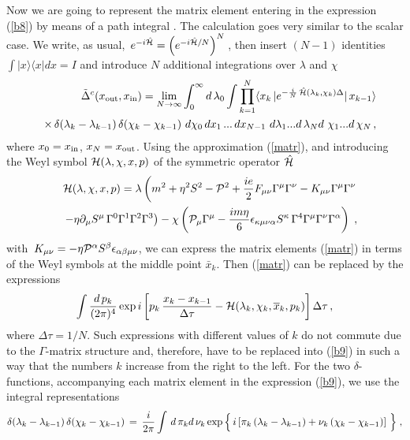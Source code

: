 Now we are going to represent the matrix element entering 
in the expression (\ref{b8}) by means of a path integral
\cite{FraGi91,gegi}. The calculation goes very
similar to the scalar case. We  write, as
usual, $\,e^{-i\hat{{\cal H}}} = \left(e^{-i\hat{{\cal H}}/N}
\right)^N\,$, then insert $(N-1)$
identities $\int|x\rangle\langle x|dx = I$ and
introduce $N$ additional integrations over $\lambda$ and $\chi$
\begin{eqnarray}
\label{b9}
&& \tilde{\Delta}^c(x_{\rm out},x_{\rm in}) =  \lim_{N\rightarrow
\infty} \int_0^\infty d\, \lambda_0
\int \prod_{k=1}^{N}\langle x_k\,|
e^{-\frac{i}{N}\,\hat{{\cal H}}(\lambda_k,\chi_k)\Delta}|\,x_{k-1}
\rangle \\
&&
\times\,\delta(\lambda_k-\lambda_{k-1})\,\delta(\chi_k-\chi_{k-1})
\,\,d\chi_0\, dx_1\, ...\, d x_{N-1}
\,\,d\lambda_1 ... d\, \lambda_N d\,\,\chi_1 ... d\, \chi_N\,,
\nonumber 
\end{eqnarray}
where $x_0=x_{\rm in}$, $x_N=x_{\rm out}$. Using the approximation
(\ref{matr}), and introducing the Weyl symbol
 ${\cal H}(\lambda,\chi,x,p)$ of the symmetric operator $\hat{{\cal H}}$
\begin{eqnarray}
\label{b11}
&&{\cal H}(\lambda,\chi,x,p) =  \lambda \left(m^2+ \eta^2 S^2
- {\cal P}^2 + \frac{ie}{2}F_{\mu\nu}\Gamma^\mu\Gamma^\nu
-K_{\mu\nu}\Gamma^\mu\Gamma^\nu
\right.  \nonumber \\
&&\left.
-\eta\partial_\mu S^\mu\,\Gamma^0\Gamma^1\Gamma^2\Gamma^3
\right) - \chi\left(
{\cal P}_\mu\Gamma^\mu -
\frac{im\eta}{6}\epsilon_{\kappa\mu\nu\alpha}S^{\kappa}
\,\Gamma^4\Gamma^{\mu}\Gamma^\nu\Gamma^\alpha
\right)\;,
\nonumber
\end{eqnarray}
with
$\,K_{\mu\nu} = - \eta{\cal P}^\alpha S^\beta\epsilon_{\alpha\beta\mu\nu}$,
we can express the matrix elements (\ref{matr}) in terms of
the Weyl symbols at the middle point ${\bar x}_k$. Then
(\ref{matr}) can be replaced by the expressions
\begin{equation}
\label{b13}
\int \frac{d\,p_k}{(2\pi)^4}
\exp i \left[ p_k\,\frac{x_k-x_{k-1}}{\Delta \tau}
- {\cal H}(\lambda_k,\chi_k, \overline{x}_k,p_k)
\right]\Delta\tau\,,
\end{equation}
where $\Delta\tau = 1/N$. Such expressions with different values 
of $k$ do not commute  due to the $\Gamma$-matrix structure and, 
therefore, have to be replaced into (\ref{b9}) in such a way that 
the numbers $k$ increase from the right to the left. For the two 
$\delta$-functions, accompanying each matrix element in the 
expression (\ref{b9}), we use the integral representations
$$
\delta(\lambda_k-\lambda_{k-1})
\,\delta(\chi_k-\chi_{k-1}) \,=\, \frac{i}{2\pi}
\int \,d\, \pi_k d\, \nu_k\, {\rm exp}\,\Big\{\,
i\left[ \pi_k\left(\lambda_k-\lambda_{k-
1}\right)+ \nu_k\left(\chi_k   -\chi_{k-1}
\right)\right]\,\Big\}
\;,
$$
